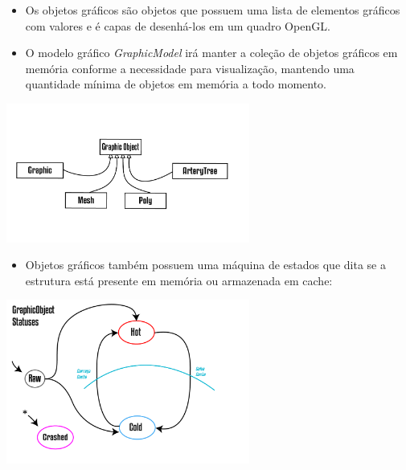 \documentclass[10pt]{beamer}
\theoremstyle{remark}
\theoremstyle{definition}
\begin{document}
\begin{frame}[allowframebreaks]
\begin{center}
		\end{center}
		\framebreak
		
		\begin{itemize}
			\item Os objetos gráficos são objetos que possuem uma lista de elementos gráficos com valores e é capas de desenhá-los em um quadro OpenGL.
			\item O modelo gráfico \textit{GraphicModel} irá manter a coleção de objetos gráficos em memória conforme a necessidade para visualização, mantendo uma quantidade mínima de objetos em memória a todo momento.
		\end{itemize}		
		
		\framebreak
		\begin{center}
			
			\item \includegraphics[width=0.6\textwidth]{images/GraphicObjects.png}
			
		\end{center}
		
		\framebreak
		
		\begin{itemize}
				\item Objetos gráficos também possuem uma máquina de estados que dita se a estrutura está presente em memória ou armazenada em cache:
		\end{itemize}		
		
		\begin{center}
			
			\item \includegraphics[width=0.6\textwidth]{images/GraphicObjectStatus.png}
			

\end{center}
\end{frame}
\end{document}
